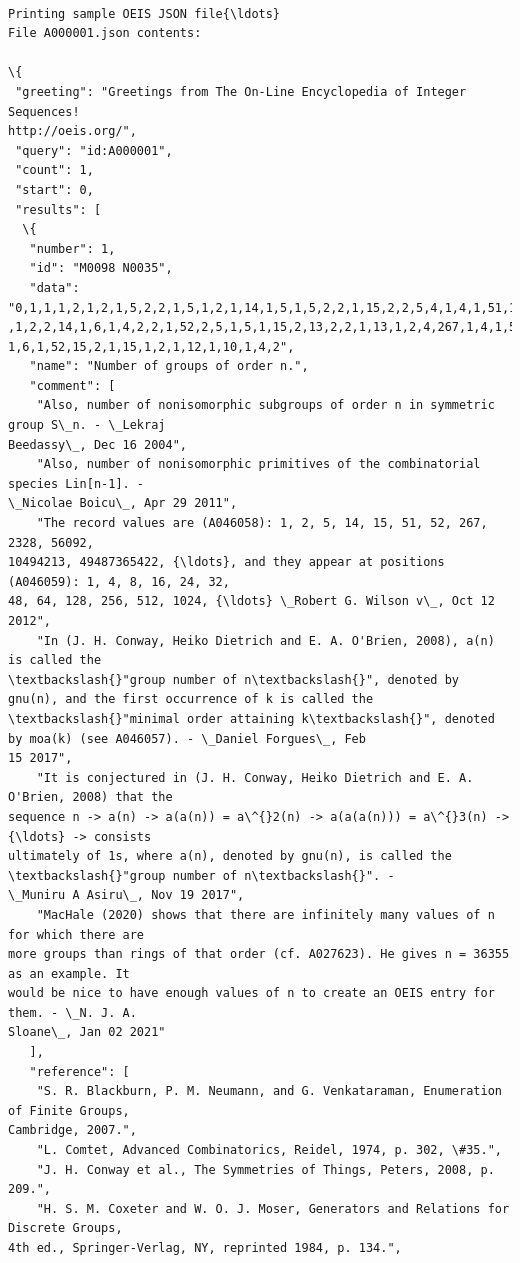 \documentclass[11pt]{article}
\begin{document}
    \begin{Verbatim}[commandchars=\\\{\}]

Printing sample OEIS JSON file{\ldots}
File A000001.json contents:

\{
 "greeting": "Greetings from The On-Line Encyclopedia of Integer Sequences!
http://oeis.org/",
 "query": "id:A000001",
 "count": 1,
 "start": 0,
 "results": [
  \{
   "number": 1,
   "id": "M0098 N0035",
   "data": "0,1,1,1,2,1,2,1,5,2,2,1,5,1,2,1,14,1,5,1,5,2,2,1,15,2,2,5,4,1,4,1,51,1,2,1,14
,1,2,2,14,1,6,1,4,2,2,1,52,2,5,1,5,1,15,2,13,2,2,1,13,1,2,4,267,1,4,1,5,1,4,1,50,1,2,3,4,
1,6,1,52,15,2,1,15,1,2,1,12,1,10,1,4,2",
   "name": "Number of groups of order n.",
   "comment": [
    "Also, number of nonisomorphic subgroups of order n in symmetric group S\_n. - \_Lekraj
Beedassy\_, Dec 16 2004",
    "Also, number of nonisomorphic primitives of the combinatorial species Lin[n-1]. -
\_Nicolae Boicu\_, Apr 29 2011",
    "The record values are (A046058): 1, 2, 5, 14, 15, 51, 52, 267, 2328, 56092,
10494213, 49487365422, {\ldots}, and they appear at positions (A046059): 1, 4, 8, 16, 24, 32,
48, 64, 128, 256, 512, 1024, {\ldots} \_Robert G. Wilson v\_, Oct 12 2012",
    "In (J. H. Conway, Heiko Dietrich and E. A. O'Brien, 2008), a(n) is called the
\textbackslash{}"group number of n\textbackslash{}", denoted by gnu(n), and the first occurrence of k is called the
\textbackslash{}"minimal order attaining k\textbackslash{}", denoted by moa(k) (see A046057). - \_Daniel Forgues\_, Feb
15 2017",
    "It is conjectured in (J. H. Conway, Heiko Dietrich and E. A. O'Brien, 2008) that the
sequence n -> a(n) -> a(a(n)) = a\^{}2(n) -> a(a(a(n))) = a\^{}3(n) -> {\ldots} -> consists
ultimately of 1s, where a(n), denoted by gnu(n), is called the \textbackslash{}"group number of n\textbackslash{}". -
\_Muniru A Asiru\_, Nov 19 2017",
    "MacHale (2020) shows that there are infinitely many values of n for which there are
more groups than rings of that order (cf. A027623). He gives n = 36355 as an example. It
would be nice to have enough values of n to create an OEIS entry for them. - \_N. J. A.
Sloane\_, Jan 02 2021"
   ],
   "reference": [
    "S. R. Blackburn, P. M. Neumann, and G. Venkataraman, Enumeration of Finite Groups,
Cambridge, 2007.",
    "L. Comtet, Advanced Combinatorics, Reidel, 1974, p. 302, \#35.",
    "J. H. Conway et al., The Symmetries of Things, Peters, 2008, p. 209.",
    "H. S. M. Coxeter and W. O. J. Moser, Generators and Relations for Discrete Groups,
4th ed., Springer-Verlag, NY, reprinted 1984, p. 134.",

\end{Verbatim}
\end{document}
